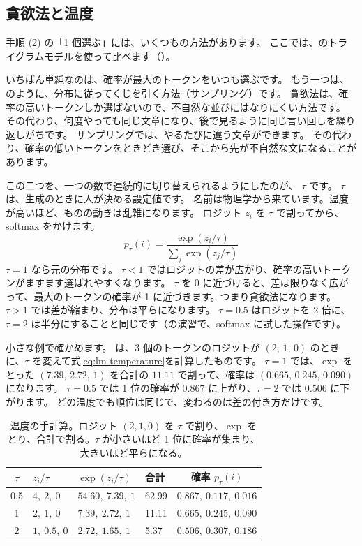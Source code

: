 \subsection*{貪欲法と温度}

手順 (2) の「1 個選ぶ」には、いくつもの方法があります。
ここでは、のトライグラムモデルを使って比べます（）。

いちばん単純なのは、確率が最大のトークンをいつも選ぶです。
もう一つは、のように、分布に従ってくじを引く方法（サンプリング）です。
貪欲法は、確率の高いトークンしか選ばないので、不自然な並びにはなりにくい方法です。
その代わり、何度やっても同じ文章になり、後で見るように同じ言い回しを繰り返しがちです。
サンプリングでは、やるたびに違う文章ができます。
その代わり、確率の低いトークンをときどき選び、そこから先が不自然な文になることがあります。

この二つを、一つの数で連続的に切り替えられるようにしたのが、 $\tau$ です。
$\tau$ は、生成のときに人が決める設定値です。
名前は物理学から来ています。温度が高いほど、ものの動きは乱雑になります。
ロジット $z_i$ を $\tau$ で割ってから、softmax をかけます。
\begin{equation}
p_\tau(i)=\frac{\exp(z_i/\tau)}{\sum_{j}\exp(z_j/\tau)}
\label{eq:lm-temperature}
\end{equation}
$\tau=1$ なら元の分布です。
$\tau<1$ ではロジットの差が広がり、確率の高いトークンがますます選ばれやすくなります。
$\tau$ を 0 に近づけると、差は限りなく広がって、最大のトークンの確率が 1 に近づきます。つまり貪欲法になります。
$\tau>1$ では差が縮まり、分布は平らになります。
$\tau=0.5$ はロジットを 2 倍に、$\tau=2$ は半分にすることと同じです（の演習で、softmax に試した操作です）。

小さな例で確かめます。
は、3 個のトークンのロジットが $(2,\,1,\,0)$ のときに、$\tau$ を変えて式\eqref{eq:lm-temperature}を計算したものです。
$\tau=1$ では、$\exp$ をとった $(7.39,\,2.72,\,1)$ を合計の $11.11$ で割って、確率は $(0.665,\,0.245,\,0.090)$ になります。
$\tau=0.5$ では 1 位の確率が $0.867$ に上がり、$\tau=2$ では $0.506$ に下がります。
どの温度でも順位は同じで、変わるのは差の付き方だけです。

\begin{table}[htbp]
\centering
\caption{温度の手計算。ロジット $(2,1,0)$ を $\tau$ で割り、$\exp$ をとり、合計で割る。$\tau$ が小さいほど 1 位に確率が集まり、大きいほど平らになる。}
\label{tab:lm-temp-example}
\small
\begin{tabular}{clllc}
\toprule
$\tau$ & $z_i/\tau$ & $\exp(z_i/\tau)$ & 合計 & 確率 $p_\tau(i)$ \\
\midrule
0.5 & $4,\ 2,\ 0$ & $54.60,\ 7.39,\ 1$ & 62.99 & $0.867,\ 0.117,\ 0.016$ \\
1 & $2,\ 1,\ 0$ & $7.39,\ 2.72,\ 1$ & 11.11 & $0.665,\ 0.245,\ 0.090$ \\
2 & $1,\ 0.5,\ 0$ & $2.72,\ 1.65,\ 1$ & 5.37 & $0.506,\ 0.307,\ 0.186$ \\
\bottomrule
\end{tabular}
\end{table}


